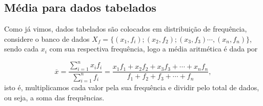 \subsection{Média para dados tabelados}
Como já vimos, dados tabelados são colocados em distribuição de frequência, considere o banco de dados $X_f=\{(x_1,f_i);(x_2,f_2);(x_3,f_3) \cdots, (x_n,f_n)\}$, sendo cada $x_i$ com sua respectiva frequência, logo a média aritmética é dada por

\begin{equation}
\label{tabelados}
    \overline{x} = \dfrac{\displaystyle\sum_{i=1}^{n}x_if_i}{\displaystyle\sum_{i=1}^nf_i} = \dfrac{x_1f_1 + x_2f_2 + x_3f_3 + \cdots + x_nf_n}{f_1 + f_2 + f_3 + \cdots + f_n},
\end{equation}
isto é, multiplicamos cada valor pela sua frequência e dividir pelo total de dados, ou seja, a soma das frequências.

